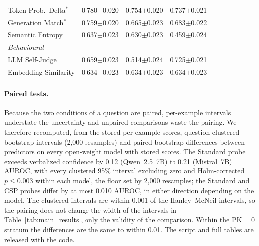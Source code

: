 \documentclass[acmsmall,screen,review]{acmart}
\begin{document}
\begin{table}[t]
\begin{tabular}{@{}lccc@{}}
  Token Prob.\ Delta$^*$ & 0.780$\pm$0.020 & 0.754$\pm$0.020 & 0.737$\pm$0.021 \\
  Generation Match$^*$ & 0.759$\pm$0.020 & 0.665$\pm$0.023 & 0.683$\pm$0.022 \\
  Semantic Entropy & 0.637$\pm$0.023 & 0.630$\pm$0.023 & 0.459$\pm$0.024 \\
\midrule
\multicolumn{4}{l}{\textit{Behavioural}} \\
  LLM Self-Judge & 0.659$\pm$0.023 & 0.514$\pm$0.024 & 0.725$\pm$0.021 \\
  Embedding Similarity & 0.634$\pm$0.023 & 0.634$\pm$0.023 & 0.634$\pm$0.023 \\
\bottomrule
\end{tabular}
\end{table}

\paragraph{Paired tests.}
Because the two conditions of a question are paired, per-example intervals understate the uncertainty and unpaired comparisons waste the pairing. We therefore recomputed, from the stored per-example scores, question-clustered bootstrap intervals (2,000 resamples) and paired bootstrap differences between predictors on every open-weight model with stored scores. The Standard probe exceeds verbalized confidence by 0.12 (Qwen~2.5~7B) to 0.21 (Mistral~7B) AUROC, with every clustered 95\% interval excluding zero and Holm-corrected $p \leq 0.003$ within each model, the floor set by 2,000 resamples; the Standard and CSP probes differ by at most 0.010 AUROC, in either direction depending on the model. The clustered intervals are within 0.001 of the Hanley--McNeil intervals, so the pairing does not change the width of the intervals in Table~\ref{tab:main_results}, only the validity of the comparison. Within the PK$=$0 stratum the differences are the same to within 0.01. The script and full tables are released with the code.
\end{document}
